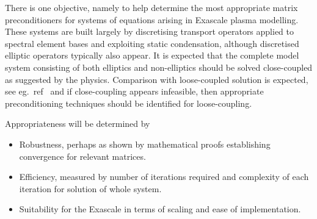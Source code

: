 There is one objective, namely to help determine the most appropriate matrix
preconditioners for systems of equations arising in Exascale plasma
modelling. These systems are built largely by discretising transport operators
applied to spectral element bases and exploiting static condensation,
although discretised elliptic operators typically also appear.
It is expected that the complete
model system consisting of both elliptics and non-elliptics should be solved
close-coupled as suggested by the physics. Comparison with
loose-coupled solution is expected, see eg.\ ref~\cite{Fe19gene}
and if close-coupling appears infeasible,
then appropriate preconditioning techniques should be identified for loose-coupling.

Appropriateness will be determined by
\begin{itemize}
\item Robustness, perhaps as shown by mathematical proofs establishing convergence
for relevant matrices.
\item Efficiency, measured by number of iterations required and complexity of each iteration
for solution of whole system.
\item Suitability for the Exascale in terms of scaling and ease of implementation.
\end{itemize}
 
